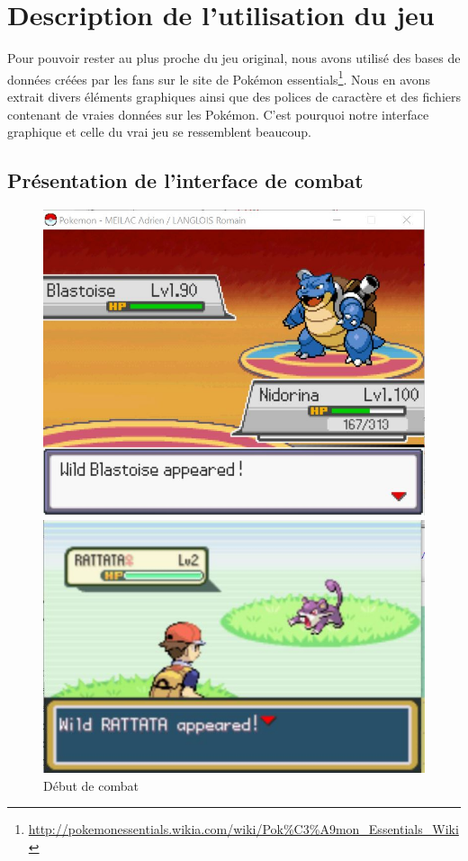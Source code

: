 \section{Description de l'utilisation du jeu}
Pour pouvoir rester au plus proche du jeu original, nous avons utilisé des bases de données créées par les fans sur le site de Pokémon essentials\footnote{\url{http://pokemonessentials.wikia.com/wiki/Pok\%C3\%A9mon\_Essentials\_Wiki}}. Nous en avons extrait divers éléments graphiques ainsi que des polices de caractère et des fichiers contenant de vraies données sur les Pokémon. C'est pourquoi notre  interface graphique et celle du vrai jeu se ressemblent beaucoup. 

\subsection{Présentation de l'interface de combat}
\begin{figure}[!h]
\begin{minipage}{0.49\textwidth}
\includegraphics[scale = 0.6]{../Images/combat_start.jpg}
\end{minipage}
\begin{minipage}{0.49\textwidth}
\includegraphics[scale = 0.84]{../Images/vrai_jeu_combat_start.jpg}
\end{minipage}
\caption{Début de combat}
\end{figure}

